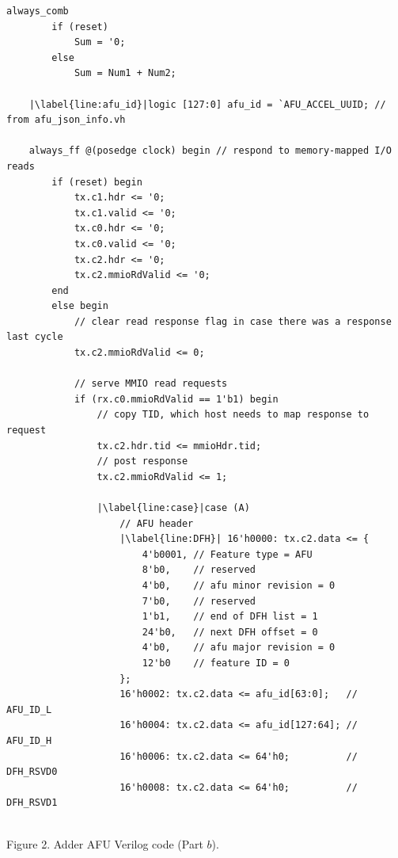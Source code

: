 \documentclass[11pt, twoside, pdftex]{article}
\begin{document}
\begin{minipage}[h]{17 cm}
\begin{lstlisting}[name=AFU]
    always_comb
        if (reset)
            Sum = '0;
        else
            Sum = Num1 + Num2;
            
    |\label{line:afu_id}|logic [127:0] afu_id = `AFU_ACCEL_UUID; // from afu_json_info.vh

    always_ff @(posedge clock) begin // respond to memory-mapped I/O reads
        if (reset) begin
            tx.c1.hdr <= '0;
            tx.c1.valid <= '0;
            tx.c0.hdr <= '0;
            tx.c0.valid <= '0;
            tx.c2.hdr <= '0;
            tx.c2.mmioRdValid <= '0;
        end
        else begin
            // clear read response flag in case there was a response last cycle
            tx.c2.mmioRdValid <= 0;

            // serve MMIO read requests
            if (rx.c0.mmioRdValid == 1'b1) begin
                // copy TID, which host needs to map response to request
                tx.c2.hdr.tid <= mmioHdr.tid;
                // post response
                tx.c2.mmioRdValid <= 1;

                |\label{line:case}|case (A)
                    // AFU header
                    |\label{line:DFH}| 16'h0000: tx.c2.data <= {
                        4'b0001, // Feature type = AFU
                        8'b0,    // reserved
                        4'b0,    // afu minor revision = 0
                        7'b0,    // reserved
                        1'b1,    // end of DFH list = 1
                        24'b0,   // next DFH offset = 0
                        4'b0,    // afu major revision = 0
                        12'b0    // feature ID = 0
                    };
                    16'h0002: tx.c2.data <= afu_id[63:0];   // AFU_ID_L
                    16'h0004: tx.c2.data <= afu_id[127:64]; // AFU_ID_H
                    16'h0006: tx.c2.data <= 64'h0;          // DFH_RSVD0
                    16'h0008: tx.c2.data <= 64'h0;          // DFH_RSVD1
                    
\end{lstlisting}
\begin{center}
Figure 2. Adder AFU Verilog code (Part $b$).
\end{center}
\end{minipage}
\end{document}
